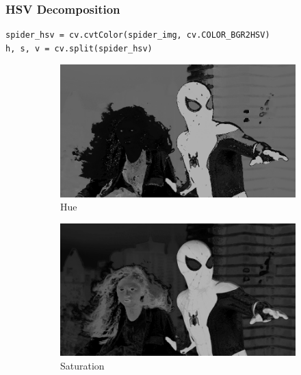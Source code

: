 \documentclass[11pt]{article}
\begin{document}
\subsubsection*{HSV Decomposition}
\begin{lstlisting}[style=pythonstyle]
spider_hsv = cv.cvtColor(spider_img, cv.COLOR_BGR2HSV)
h, s, v = cv.split(spider_hsv)
\end{lstlisting}
\begin{figure}[H]
    \centering
    \begin{subfigure}{0.3\textwidth}
        \includegraphics[width=\textwidth]{resources/spider_hue.png}
        \caption{Hue}
    \end{subfigure}
    \hfill
    \begin{subfigure}{0.3\textwidth}
        \includegraphics[width=\textwidth]{resources/spider_saturation.png}
        \caption{Saturation}
    \end{subfigure}
    \hfill
    \begin{subfigure}{0.3\textwidth}

\end{subfigure}
\end{figure}
\end{document}
